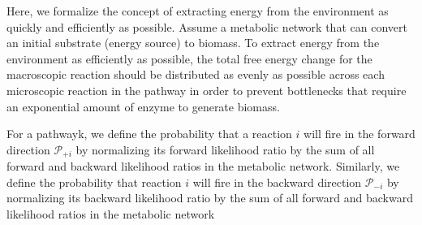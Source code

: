 Here, we formalize the concept of extracting energy from the environment as quickly and efficiently as possible. Assume a metabolic network that can convert an initial substrate (energy source) to biomass. To extract energy from the environment as efficiently as possible, the total free energy change for the macroscopic reaction should be distributed as evenly as possible across each microscopic reaction in the pathway in order to prevent bottlenecks that require an exponential amount of enzyme to generate biomass.


For a pathwayk, we define the probability that a reaction $i$ will fire in the forward  direction ${\mathcal P_{+i}}$ by normalizing its forward likelihood ratio by the sum of all forward and backward likelihood ratios in the metabolic network. Similarly, we define the probability that reaction $i$ will fire in the backward direction $\mathcal P_{-i}$ by normalizing its backward likelihood ratio by  the sum of all forward and backward likelihood ratios in the metabolic network